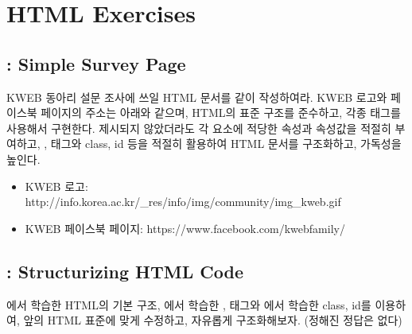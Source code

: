 \section{HTML Exercises}\label{sect:html-exercises}

\subsection*{: Simple Survey Page}

KWEB 동아리 설문 조사에 쓰일 HTML 문서를 \와 같이 작성하여라. KWEB 로고와 페이스북 페이지의 주소는 아래와 같으며, HTML의 표준 구조를 준수하고, 각종 태그를 사용해서 구현한다. 제시되지 않았더라도 각 요소에 적당한 속성과 속성값을 적절히 부여하고, ,  태그와 class, id 등을 적절히 활용하여 HTML 문서를 구조화하고, 가독성을 높인다.

\begin{itemize}
    \item KWEB 로고: http://info.korea.ac.kr/\_res/info/img/community/img\_kweb.gif
    \item KWEB 페이스북 페이지: https://www.facebook.com/kwebfamily/
\end{itemize}

    {}

\subsection*{: Structurizing HTML Code}

에서 학습한 HTML의 기본 구조, 에서 학습한 ,  태그와 에서 학습한 class, id를 이용하여, 앞의 \를 HTML 표준에 맞게 수정하고, 자유롭게 구조화해보자. (정해진 정답은 없다)
